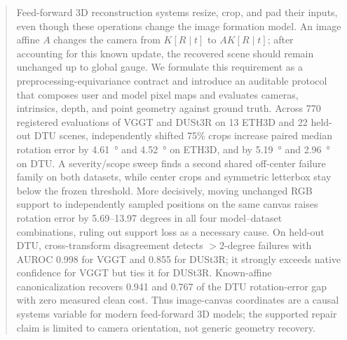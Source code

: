 \begin{abstract}
Feed-forward 3D reconstruction systems resize, crop, and pad their inputs, even
though these operations change the image formation model.  An image affine
$A$ changes the camera from $K[R\mid t]$ to $AK[R\mid t]$; after accounting for
this known update, the recovered scene should remain unchanged up to global
gauge.  We formulate this requirement as a preprocessing-equivariance contract
and introduce an auditable protocol that composes user and model pixel maps and
evaluates cameras, intrinsics, depth, and point geometry against ground truth.
Across 770 registered evaluations of VGGT and DUSt3R on 13 ETH3D and 22 held-out
DTU scenes, independently shifted 75\% crops increase paired median rotation
error by \SI{4.61}{\degree} and \SI{4.52}{\degree} on ETH3D, and by
\SI{5.19}{\degree} and \SI{2.96}{\degree} on DTU.  A severity/scope sweep finds
a second shared off-center failure family on both datasets, while center crops
and symmetric letterbox stay below the frozen threshold.  More decisively,
moving unchanged RGB support to independently sampled positions on the same
canvas raises rotation error by 5.69--13.97 degrees in all four model--dataset
combinations, ruling out support loss as a necessary cause.  On held-out DTU,
cross-transform disagreement detects $>\!2$-degree failures with AUROC 0.998
for VGGT and 0.855 for DUSt3R; it strongly exceeds native confidence for VGGT
but ties it for DUSt3R.  Known-affine canonicalization recovers 0.941 and 0.767
of the DTU rotation-error gap with zero measured clean cost.  Thus image-canvas
coordinates are a causal systems variable for modern feed-forward 3D models;
the supported repair claim is limited to camera orientation, not generic
geometry recovery.
\end{abstract}
